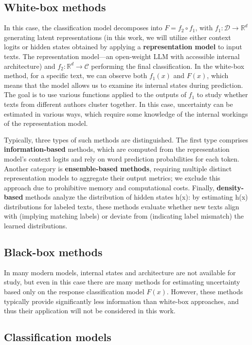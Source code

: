 \documentclass[a4paper, 12pt]{article}
\begin{document}
\subsection {White-box methods}  
In this case, the classification model decomposes into \( F = f_2 \circ f_1 \), with \( f_1: \mathcal{D} \rightarrow \mathbb{R}^d \) generating latent representations (in this work, we will utilize either context logits or hidden states obtained by applying a \textbf{representation model} to input texts. The representation model—an open-weight LLM with accessible internal architecture) and \( f_2: \mathbb{R}^d \rightarrow \mathcal{C} \) performing the final classification. In the white-box method, for a specific text, we can observe both \(f_1(x)\) and \(F(x)\), which means that the model allows us to examine its internal states during prediction. The goal is to use various functions applied to the outputs of $f_1$ to study whether texts from different authors cluster together. In this case, uncertainty can be estimated in various ways\citep{Polygraph}, which require some knowledge of the internal workings of the representation model. 

Typically, three types of such methods are distinguished. The first type comprises \textbf{information-based} methods, which are computed from the representation model's context logits and rely on word prediction probabilities for each token. Another category is \textbf{ensemble-based methods}, requiring multiple distinct representation models to aggregate their output metrics; we exclude this approach due to prohibitive memory and computational costs. Finally, \textbf{density-based} methods analyze the distribution of hidden states h(x): by estimating h(x) distributions for labeled texts, these methods evaluate whether new texts align with (implying matching labels) or deviate from (indicating label mismatch) the learned distributions.

\subsection {Black-box methods}   
In many modern models, internal states and architecture are not available for study, but even in this case there are many methods for estimating uncertainty based only on the response classification model \(F(x)\). However, these methods typically provide significantly less information than white-box approaches, and thus their application will not be considered in this work.

\subsection{Classification models}
\end{document}
